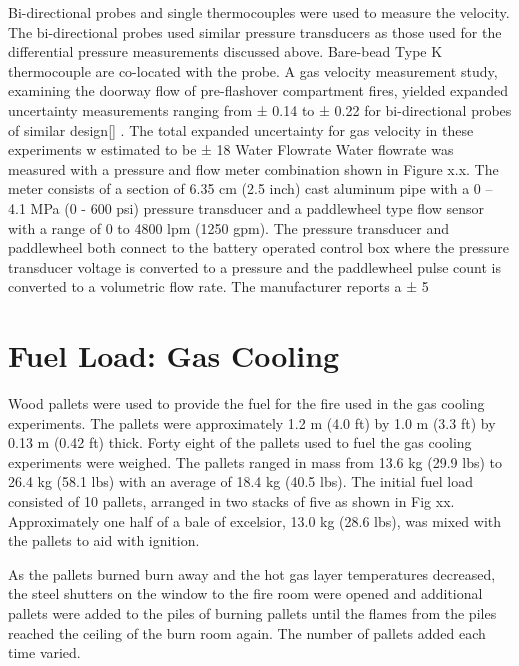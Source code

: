 \documentclass[12pt,oneside]{book}
\begin{document}
Bi-directional probes and single thermocouples were used to measure the velocity.  The bi-directional probes used similar pressure transducers as those used for the differential pressure measurements discussed above.   Bare-bead Type K thermocouple are co-located with the probe. A gas velocity measurement study, examining the doorway flow of pre-flashover compartment fires, yielded expanded uncertainty measurements ranging from ± 0.14 to ± 0.22 for bi-directional probes of similar design[] .  The total expanded uncertainty for gas velocity in these experiments w estimated to be  ± 18 %
Water Flowrate
Water flowrate was measured with a pressure and flow meter combination shown in Figure x.x. The meter consists of a section of 6.35 cm (2.5 inch) cast aluminum pipe with a 0 – 4.1 MPa (0 - 600 psi) pressure transducer and a paddlewheel type flow sensor with a range of 0 to 4800 lpm (1250 gpm). The pressure transducer and paddlewheel both connect to the battery operated control box where the pressure transducer voltage is converted to a pressure and the paddlewheel pulse count is converted to a volumetric flow rate.  The manufacturer reports a ± 5 %

\section{Fuel Load: Gas Cooling}
\label{sec:Fuel_Load:_Gas_Cooling} 

Wood pallets were used to provide the fuel for the fire used in the gas cooling experiments.  The pallets were approximately   1.2 m (4.0 ft) by 1.0 m (3.3 ft) by 0.13 m (0.42 ft) thick.  Forty eight of the pallets used to fuel the gas cooling experiments were weighed.  The pallets ranged in mass from 13.6 kg (29.9 lbs) to 26.4 kg (58.1 lbs) with an average of 18.4 kg (40.5 lbs).  The initial fuel load consisted of 10 pallets, arranged in two stacks of five as shown in Fig xx.  Approximately one half of a bale of excelsior, 13.0  kg (28.6 lbs), was mixed with the pallets to aid with ignition.  

As the pallets burned burn away and the hot gas layer temperatures decreased, the steel shutters on the window to the fire room were opened and additional pallets were added to the piles of burning pallets until the flames from the piles reached the ceiling of the burn room again.  The number of pallets added each time varied.
\end{document}
